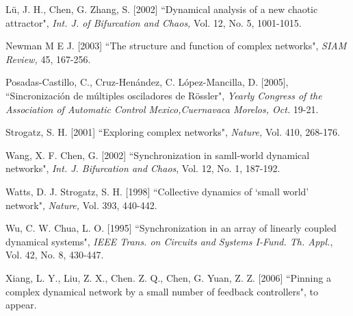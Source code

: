 \documentclass[11pt]{article}
\begin{document}
\begin{thebibliography}{10}
 { L\"{u}, J. H., Chen, G.  Zhang, S. [2002]
``Dynamical analysis of a new chaotic attractor",  {\it Int. J. of
Bifurcation and Chaos,} Vol. 12, No. 5, 1001-1015.}

 { Newman M E J. [2003]
``The structure and function of complex networks",  {\it SIAM
Review,} 45, 167-256.}

 {Posadas-Castillo, C., Cruz-Hen\'{a}ndez, C.  L\'{o}pez-Mancilla, D. [2005],
``Sincronizaci\'{o}n de m\'{u}ltiples osciladores de R\"{o}ssler",
{\it Yearly Congress of the Association of Automatic Control
Mexico,Cuernavaca Morelos, Oct. } 19-21. }

 { Strogatz, S. H. [2001] ``Exploring complex networks",
{\it Nature,} Vol. 410, 268-176.}

 { Wang, X. F.   Chen, G. [2002]
``Synchronization in samll-world dynamical networks", {\it Int. J.
Bifurcation and Chaos}, Vol. 12, No. 1, 187-192.}

 { Watts, D. J.  Strogatz, S. H. [1998] ``Collective dynamics of `small world' network",
{\it Nature,} Vol. 393, 440-442.}

 { Wu, C. W.   Chua, L. O. [1995]
``Synchronization in an array of linearly coupled dynamical
systems", {\it IEEE Trans. on Circuits and Systems I-Fund. Th.
Appl.}, Vol. 42, No. 8, 430-447.}

 { Xiang, L. Y., Liu, Z. X., Chen. Z. Q., Chen, G.   Yuan, Z. Z. [2006]
``Pinning a complex dynamical network by a small number of feedback
controllers", to appear.}




\end{thebibliography}
\end{document}

